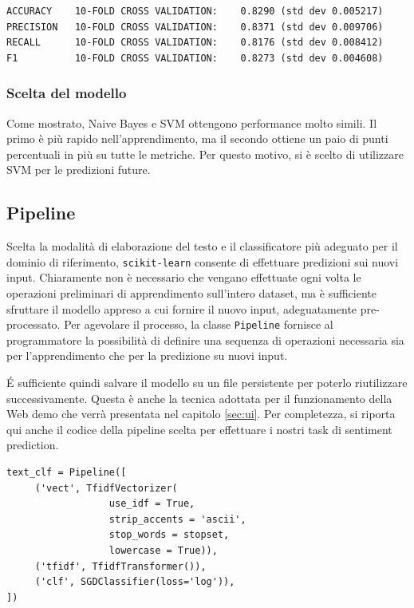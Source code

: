 \documentclass[hidelinks, 12pt]{article}
\begin{document}
\begin{verbatim}
ACCURACY    10-FOLD CROSS VALIDATION:    0.8290 (std dev 0.005217)
PRECISION   10-FOLD CROSS VALIDATION:    0.8371 (std dev 0.009706)
RECALL      10-FOLD CROSS VALIDATION:    0.8176 (std dev 0.008412)
F1          10-FOLD CROSS VALIDATION:    0.8273 (std dev 0.004608)
\end{verbatim}


\subsubsection{Scelta del modello}

Come mostrato, Naive Bayes e SVM ottengono performance molto simili. Il primo è più rapido nell'apprendimento, ma il secondo ottiene un paio di punti percentuali in più su tutte le metriche. Per questo motivo, si è scelto di utilizzare SVM per le predizioni future.



\subsection{Pipeline}

Scelta la modalità di elaborazione del testo e il classificatore più adeguato per il dominio di riferimento, \texttt{scikit-learn} consente di effettuare predizioni sui nuovi input. Chiaramente non è necessario che vengano effettuate ogni volta le operazioni preliminari di apprendimento sull'intero dataset, ma è sufficiente sfruttare il modello appreso a cui fornire il nuovo input, adeguatamente pre-processato. Per agevolare il processo, la classe \texttt{Pipeline} fornisce al programmatore la possibilità di definire una sequenza di operazioni necessaria sia per l'apprendimento che per la predizione su nuovi input.

É sufficiente quindi salvare il modello su un file persistente per poterlo riutilizzare successivamente. Questa è anche la tecnica adottata per il funzionamento della Web demo che verrà presentata nel capitolo \ref{sec:ui}. Per completezza, si riporta qui anche il codice della pipeline scelta per effettuare i nostri task di sentiment prediction.

\begin{verbatim}
text_clf = Pipeline([
     ('vect', TfidfVectorizer(
                  use_idf = True,
                  strip_accents = 'ascii',
                  stop_words = stopset,
                  lowercase = True)),
     ('tfidf', TfidfTransformer()),
     ('clf', SGDClassifier(loss='log')),
])
\end{verbatim}
\end{document}
